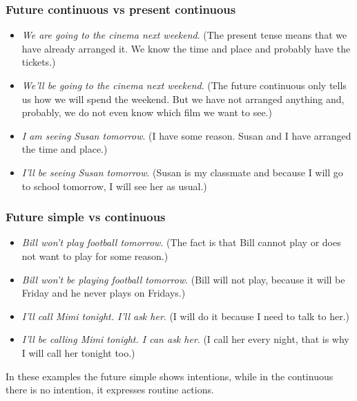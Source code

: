 \begin{itemize}
\begin{itemize}
\end{itemize}

\subsubsection{Future continuous vs present continuous}

\begin{itemize}
\item \textit{We are going to the cinema next weekend}. (The present tense means that we have already arranged it. We know the time and place and probably have the tickets.)

\item \textit{We'll be going to the cinema next weekend}. (The future continuous only tells us how we will spend the weekend. But we have not arranged anything and, probably, we do not  even know which film we want to see.)

\item \textit{I am seeing Susan tomorrow}. (I have some reason. Susan and I have arranged the time and place.) 

\item \textit{I'll be seeing Susan tomorrow}. (Susan is my classmate and because I will go to school tomorrow, I will see her as usual.) 
\end{itemize}

\subsubsection{Future simple vs continuous}

\begin{itemize}

\item \textit{Bill won't play football tomorrow}. (The fact is that Bill cannot play or does not want to play for some reason.)
\item \textit{Bill won't be playing football tomorrow}. (Bill will not play, because it will be Friday  and he never plays on Fridays.) 
\item \textit{I'll call Mimi tonight. I'll ask her}. (I will do it because I need to talk to her.) 
\item \textit{I'll be calling Mimi tonight. I can ask her}. (I call her every night, that is why I will call her tonight too.)

\end{itemize}

In these examples the future simple shows intentions, while in the continuous there is no intention, it expresses routine actions.


\end{itemize}
